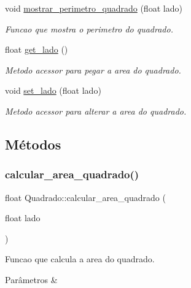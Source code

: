 \begin{DoxyCompactItemize}
void \hyperlink{classQuadrado_a14e714f50852960cb6a7059bbdbcb390}{mostrar\+\_\+perimetro\+\_\+quadrado} (float lado)
\begin{DoxyCompactList}\small\item\em Funcao que mostra o perimetro do quadrado. \end{DoxyCompactList}\item 
float \hyperlink{classQuadrado_a53cc7321dc6a0f4d17953194a2d1dd2c}{get\+\_\+lado} ()
\begin{DoxyCompactList}\small\item\em Metodo acessor para pegar a area do quadrado. \end{DoxyCompactList}\item 
void \hyperlink{classQuadrado_aecf8499d73d86b3f6fe292038d450eb0}{set\+\_\+lado} (float lado)
\begin{DoxyCompactList}\small\item\em Metodo acessor para alterar a area do quadrado. \end{DoxyCompactList}\end{DoxyCompactItemize}


\subsection{Métodos}
\mbox{\label{classQuadrado_ac9a1b2cbb7c64216548df116ec7c2d3a}} 
\subsubsection{\texorpdfstring{calcular\+\_\+area\+\_\+quadrado()}{calcular\_area\_quadrado()}}
{\footnotesize\ttfamily float Quadrado\+::calcular\+\_\+area\+\_\+quadrado (\begin{DoxyParamCaption}\item[{float}]{lado }\end{DoxyParamCaption})}



Funcao que calcula a area do quadrado. 


\begin{DoxyParams}{Parâmetros}
{\em } & \\
\hline
\end{DoxyParams}
\mbox{\label{classQuadrado_ae6dd8e8a8103c7b144fade9b2c4b87d4}} 
